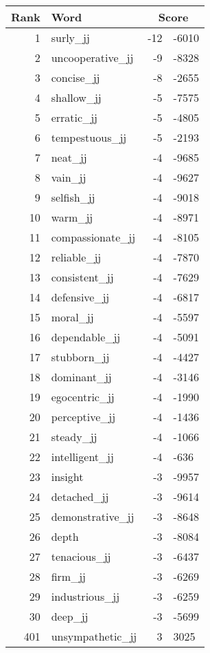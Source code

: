\begin{longtable}[!htbp]{| rlr@{.}l |}
    \hline
    \textbf{Rank} & \textbf{Word} & \multicolumn{2}{c|}{\textbf{Score}} \\
    \hline
    \endhead
    1 & surly\_jj & -12 & -6010 \\
    2 & uncooperative\_jj & -9 & -8328 \\
    3 & concise\_jj & -8 & -2655 \\
    4 & shallow\_jj & -5 & -7575 \\
    5 & erratic\_jj & -5 & -4805 \\
    6 & tempestuous\_jj & -5 & -2193 \\
    7 & neat\_jj & -4 & -9685 \\
    8 & vain\_jj & -4 & -9627 \\
    9 & selfish\_jj & -4 & -9018 \\
    10 & warm\_jj & -4 & -8971 \\
    11 & compassionate\_jj & -4 & -8105 \\
    12 & reliable\_jj & -4 & -7870 \\
    13 & consistent\_jj & -4 & -7629 \\
    14 & defensive\_jj & -4 & -6817 \\
    15 & moral\_jj & -4 & -5597 \\
    16 & dependable\_jj & -4 & -5091 \\
    17 & stubborn\_jj & -4 & -4427 \\
    18 & dominant\_jj & -4 & -3146 \\
    19 & egocentric\_jj & -4 & -1990 \\
    20 & perceptive\_jj & -4 & -1436 \\
    21 & steady\_jj & -4 & -1066 \\
    22 & intelligent\_jj & -4 & -636 \\
    23 & insight & -3 & -9957 \\
    24 & detached\_jj & -3 & -9614 \\
    25 & demonstrative\_jj & -3 & -8648 \\
    26 & depth & -3 & -8084 \\
    27 & tenacious\_jj & -3 & -6437 \\
    28 & firm\_jj & -3 & -6269 \\
    29 & industrious\_jj & -3 & -6259 \\
    30 & deep\_jj & -3 & -5699 \\
    401 & unsympathetic\_jj & 3 & 3025 \\

\end{longtable}
